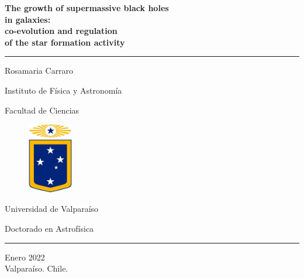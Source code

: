\begin{titlepage}

\sffamily

\vspace{10mm}

\begin{centering}

{\huge \bfseries The growth of supermassive black holes \\in galaxies:}\\
\vspace{0.2cm}
{\huge \bf co-evolution and regulation \\of the star formation activity}

\vspace{2mm}

\noindent\rule{0.9\textwidth}{0.025truein}

\Large

\vspace{20mm}

{\sc Rosamaria Carraro}

\large

\vspace{15mm}
{Instituto de F\'isica y Astronom\'ia}

{Facultad de Ciencias}

\vspace{20mm}
\begin{figure}[h!]
\begin{center}
\includegraphics[width=2cm]{logo.jpeg}
\end{center}
\end{figure}
\vspace{10mm}

\large

{Universidad de Valpara\'iso}

{Doctorado en Astrof\'isica}

\vspace{10mm} \noindent\rule{1.5truein}{0.02truein}

{Enero 2022\\ Valpara\'iso. Chile.}

\end{centering}

\vfill

\end{titlepage}
\normalsize

